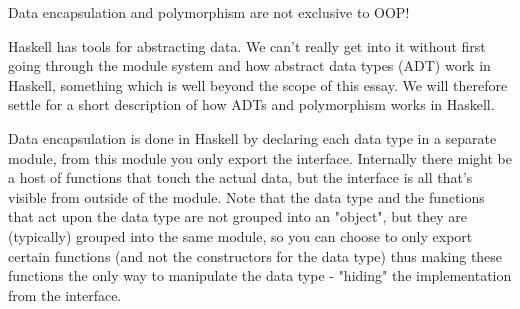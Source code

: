 \documentclass[main.tex]{subfiles}
\begin{document}
{{Data encapsulation and polymorphism are not exclusive to OOP!

Haskell has tools for abstracting data. We can't really get into it without first going through the module system and how abstract data types (ADT) work in Haskell, something which is well beyond the scope of this essay. We will therefore settle for a short description of how ADTs and polymorphism works in Haskell.

Data encapsulation is done in Haskell by declaring each data type in a separate module, from this module you only export the interface. Internally there might be a host of functions that touch the actual data, but the interface is all that's visible from outside of the module. Note that the data type and the functions that act upon the data type are not grouped into an "object", but they are (typically) grouped into the same module, so you can choose to only export certain functions (and not the constructors for the data type) thus making these functions the only way to manipulate the data type - "hiding" the implementation from the interface.

}}
\end{document}

